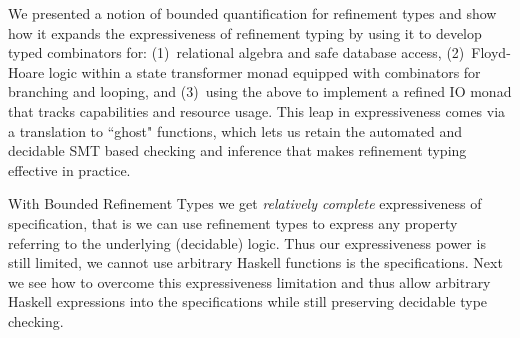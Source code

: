 We presented a notion of bounded quantification for refinement types
and show how it expands the expressiveness of refinement typing
by using it to develop typed combinators for:
%
(1)~relational algebra and safe database access,
%
(2)~Floyd-Hoare logic within a state transformer
    monad equipped with combinators for branching
    and looping, and
%
(3)~using the above to implement a refined IO
    monad that tracks capabilities and resource usage.
%
This leap in expressiveness comes via a translation to ``ghost" functions,
which lets us retain the automated and decidable SMT based checking and
inference that makes refinement typing effective in practice.

With Bounded Refinement Types we get \textit{relatively complete} 
expressiveness of specification, that is we can use refinement types
to express any property referring to the underlying (decidable) logic. 
%
Thus our expressiveness power is still limited, 
we cannot use arbitrary Haskell functions is the specifications. 
%
Next we see how to overcome this expressiveness limitation 
and thus allow arbitrary Haskell expressions into the specifications
while still preserving decidable type checking. 